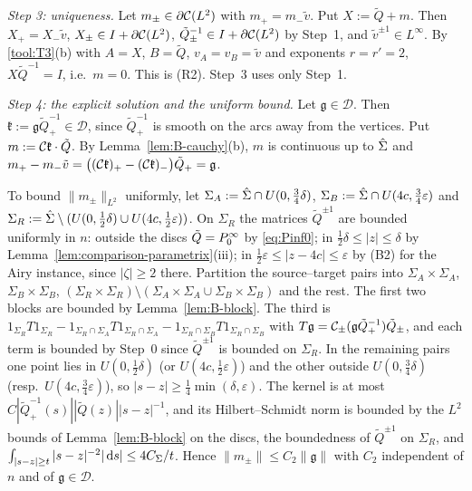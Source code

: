 \emph{Step 3: uniqueness.} Let $m_\pm\in\partial\mathcal{C}(L^2)$ with $m_+=m_-\tilde v$. Put $X:=\tilde Q+m$. Then $X_+=X_-\tilde v$,
$X_\pm\in I+\partial\mathcal{C}(L^2)$, $\tilde Q_\pm^{-1}\in I+\partial\mathcal{C}(L^2)$ by Step~1, and $\tilde v^{\pm1}\in L^\infty$. By \ref{tool:T3}(b) with
$A=X$, $B=\tilde Q$, $v_A=v_B=\tilde v$ and exponents $r=r'=2$, $X\tilde Q^{-1}=I$, i.e.\ $m=0$. This is (R2). Step~3 uses
only Step~1.

\emph{Step 4: the explicit solution and the uniform bound.} Let $\mathfrak g\in\mathcal D$. Then $\mathfrak k:=\mathfrak
g\tilde Q_+^{-1}\in\mathcal D$, since $\tilde Q_+^{-1}$ is smooth on the arcs away from the vertices. Put $m:=\mathcal{C}\mathfrak
k\cdot\tilde Q$. By Lemma~\ref{lem:B-cauchy}(b), $m$ is continuous up to $\hat\Sigma$ and
$m_+-m_-\tilde v=\bigl((\mathcal{C}\mathfrak k)_+-(\mathcal{C}\mathfrak k)_-\bigr)\tilde Q_+=\mathfrak g$.

To bound $\|m_\pm\|_{L^2}$ uniformly, let $\Sigma_A:=\hat\Sigma\cap U(0,\frac34\delta)$, $\Sigma_B:=\hat\Sigma\cap U(4c,\frac34\varepsilon)$
and $\Sigma_R:=\hat\Sigma\setminus(U(0,\frac12\delta)\cup U(4c,\frac12\varepsilon))$. On $\Sigma_R$ the matrices $\tilde Q^{\pm1}$ are
bounded uniformly in $n$: outside the discs $\tilde Q=P^\infty_0$ by \eqref{eq:Pinf0}; in $\frac12\delta\le|z|\le\delta$ by
Lemma~\ref{lem:comparison-parametrix}(iii); in $\frac12\varepsilon\le|z-4c|\le\varepsilon$ by (B2) for the Airy instance, since
$|\zeta|\ge2$ there. Partition the source--target pairs into $\Sigma_A\times\Sigma_A$, $\Sigma_B\times\Sigma_B$,
$(\Sigma_R\times\Sigma_R)\setminus(\Sigma_A\times\Sigma_A\cup\Sigma_B\times\Sigma_B)$ and the rest. The first two blocks are bounded by
Lemma~\ref{lem:B-block}. The third is $1_{\Sigma_R}T1_{\Sigma_R}-1_{\Sigma_R\cap\Sigma_A}T1_{\Sigma_R\cap\Sigma_A}-
1_{\Sigma_R\cap\Sigma_B}T1_{\Sigma_R\cap\Sigma_B}$ with $T\mathfrak g=\mathcal{C}_\pm(\mathfrak g\tilde Q_+^{-1})\tilde Q_\pm$, and each
term is bounded by Step~0 since $\tilde Q^{\pm1}$ is bounded on $\Sigma_R$. In the remaining pairs one point lies in
$U(0,\frac12\delta)$ (or $U(4c,\frac12\varepsilon)$) and the other outside $U(0,\frac34\delta)$ (resp.\ $U(4c,\frac34\varepsilon)$), so
$|s-z|\ge\frac14\min(\delta,\varepsilon)$. The kernel is at most $C|\tilde Q_+^{-1}(s)||\tilde Q(z)||s-z|^{-1}$, and its
Hilbert--Schmidt norm is bounded by the $L^2$ bounds of Lemma~\ref{lem:B-block} on the discs, the boundedness of
$\tilde Q^{\pm1}$ on $\Sigma_R$, and $\int_{|s-z|\ge t}|s-z|^{-2}|\,\mathrm{d} s|\le4C_\Sigma/t$. Hence $\|m_\pm\|\le C_2\|\mathfrak g\|$ with
$C_2$ independent of $n$ and of $\mathfrak g\in\mathcal D$.

